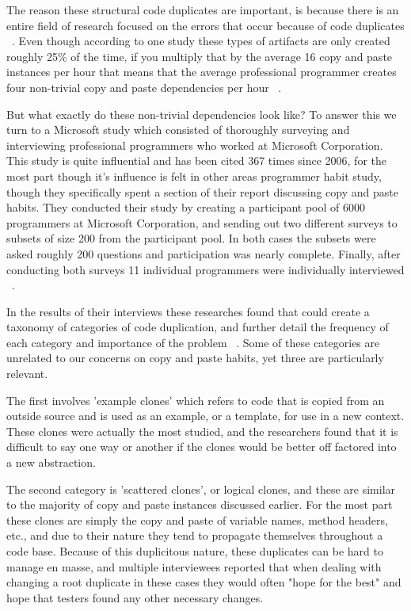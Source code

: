\documentclass{acm_proc_article-sp}
\begin{document}
The reason these structural code duplicates are important, is because there is an entire field of research focused on the errors that occur because of code duplicates ~\cite{devWorkHabits}. Even though according to one study these types of artifacts are only created roughly 25\% of the time, if you multiply that by the average 16 copy and paste instances per hour that means that the average professional programmer creates four non-trivial copy and paste dependencies per hour ~\cite{ooplCP}. 

But what exactly do these non-trivial dependencies look like? To answer this we turn to a Microsoft study which consisted of thoroughly surveying and interviewing professional programmers who worked at Microsoft Corporation. This study is quite influential and has been cited 367 times since 2006, for the most part though it's influence is felt in other areas programmer habit study, though they specifically spent a section of their report discussing copy and paste habits. They conducted their study by creating a participant pool of 6000 programmers at Microsoft Corporation, and sending out two different surveys to subsets of size 200 from the participant pool. In both cases the subsets were asked roughly 200 questions and participation was nearly complete. Finally, after conducting both surveys 11 individual programmers were individually interviewed ~\cite{devWorkHabits}. 

In the results of their interviews these researches found that could create a taxonomy of categories of code duplication, and further detail the frequency of each category and importance of the problem ~\cite{devWorkHabits}. Some of these categories are unrelated to our concerns on copy and paste habits, yet three are particularly relevant. 

The first involves 'example clones' which refers to code that is copied from an outside source and is used as an example, or a template, for use in a new context. These clones were actually the most studied, and the researchers found that it is difficult to say one way or another if the clones would be better off factored into a new abstraction. 

The second category is 'scattered clones', or logical clones, and these are similar to the majority of copy and paste instances discussed earlier. For the most part these clones are simply the copy and paste of variable names, method headers, etc., and due to their nature they tend to propagate themselves throughout a code base. Because of this duplicitous nature, these duplicates can be hard to manage en masse, and multiple interviewees reported that when dealing with changing a root duplicate in these cases they would often "hope for the best" and hope that testers found any other necessary changes.
\end{document}
